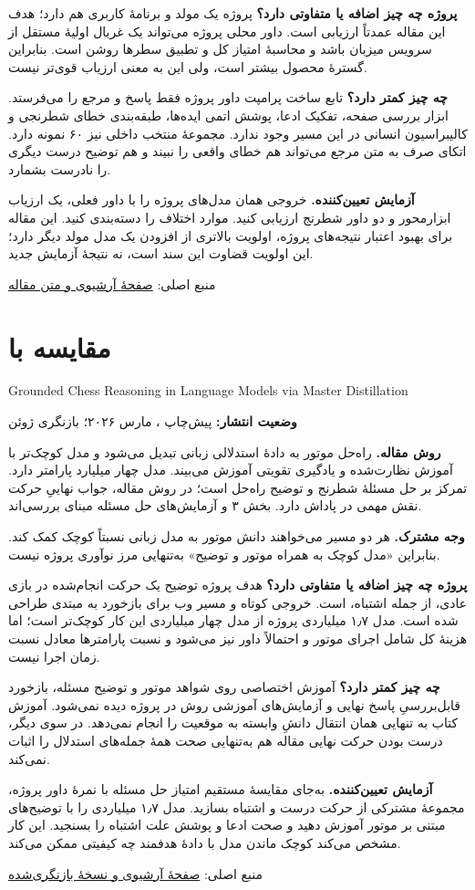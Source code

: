 \documentclass[a4paper,12pt]{article}
\newcommand{\en}[1]{\lr{#1}}
\newcommand{\source}[2]{\par\small منبع اصلی: \href{#1}{#2}\par\normalsize}
\newcommand{\paper}[3]{\clearpage\section{#1}\begin{latin}\small #2\end{latin}\textbf{وضعیت انتشار:} #3\par}
\begin{document}
\textbf{پروژه چه چیز اضافه یا متفاوتی دارد؟} پروژه یک مولد و برنامهٔ کاربری هم دارد؛ هدف این مقاله عمدتاً ارزیابی است. داور محلی پروژه می‌تواند یک غربال اولیهٔ مستقل از سرویس میزبان باشد و محاسبهٔ امتیاز کل و تطبیق سطرها روشن است. بنابراین گسترهٔ محصول بیشتر است، ولی این به معنی ارزیاب قوی‌تر نیست.

\textbf{چه چیز کمتر دارد؟} تابع ساخت پرامپت داور پروژه فقط پاسخ و مرجع را می‌فرستد. ابزار بررسی صفحه، تفکیک ادعا، پوشش اتمی ایده‌ها، طبقه‌بندی خطای شطرنجی و کالیبراسیون انسانی در این مسیر وجود ندارد. مجموعهٔ منتخب داخلی نیز ۶۰ نمونه دارد. اتکای صرف به متن مرجع می‌تواند هم خطای واقعی را نبیند و هم توضیح درست دیگری را نادرست بشمارد.

\textbf{آزمایش تعیین‌کننده.} خروجی همان مدل‌های پروژه را با داور فعلی، یک ارزیاب ابزارمحور و دو داور شطرنج ارزیابی کنید. موارد اختلاف را دسته‌بندی کنید. این مقاله برای بهبود اعتبار نتیجه‌های پروژه، اولویت بالاتری از افزودن یک مدل مولد دیگر دارد؛ این اولویت قضاوت این سند است، نه نتیجهٔ آزمایش جدید.
\source{https://arxiv.org/abs/2608.04240}{صفحهٔ آرشیوی و متن مقاله}

\paper{مقایسه با \en{Tang et al.}}{Grounded Chess Reasoning in Language Models via Master Distillation}{پیش‌چاپ \en{arXiv}، مارس ۲۰۲۶؛ بازنگری ژوئن}
\textbf{روش مقاله.} راه‌حل موتور به دادهٔ استدلالی زبانی تبدیل می‌شود و مدل کوچک‌تر با آموزش نظارت‌شده و یادگیری تقویتی آموزش می‌بیند. مدل \en{C1} چهار میلیارد پارامتر دارد. تمرکز بر حل مسئلهٔ شطرنج و توضیح راه‌حل است؛ در روش مقاله، جواب نهاییِ حرکت نقش مهمی در پاداش دارد. بخش ۳ و آزمایش‌های حل مسئله مبنای بررسی‌اند.

\textbf{وجه مشترک.} هر دو مسیر می‌خواهند دانش موتور به مدل زبانی نسبتاً کوچک کمک کند. بنابراین «مدل کوچک به همراه موتور و توضیح» به‌تنهایی مرز نوآوری پروژه نیست.

\textbf{پروژه چه چیز اضافه یا متفاوتی دارد؟} هدف پروژه توضیح یک حرکت انجام‌شده در بازی عادی، از جمله اشتباه، است. خروجی کوتاه و مسیر وب برای بازخورد به مبتدی طراحی شده است. مدل ۱٫۷ میلیاردی پروژه از مدل چهار میلیاردی این کار کوچک‌تر است؛ اما هزینهٔ کل شامل اجرای موتور و احتمالاً داور نیز می‌شود و نسبت پارامترها معادل نسبت زمان اجرا نیست.

\textbf{چه چیز کمتر دارد؟} آموزش اختصاصی روی شواهد موتور و توضیح مسئله، بازخورد قابل‌بررسیِ پاسخ نهایی و آزمایش‌های آموزشی روش در پروژه دیده نمی‌شود. آموزش کتاب به تنهایی همان انتقال دانشِ وابسته به موقعیت را انجام نمی‌دهد. در سوی دیگر، درست بودن حرکت نهایی مقاله هم به‌تنهایی صحت همهٔ جمله‌های استدلال را اثبات نمی‌کند.

\textbf{آزمایش تعیین‌کننده.} به‌جای مقایسهٔ مستقیم امتیاز حل مسئله با نمرهٔ داور پروژه، مجموعهٔ مشترکی از حرکت درست و اشتباه بسازید. مدل ۱٫۷ میلیاردی را با توضیح‌های مبتنی بر موتور آموزش دهید و صحت ادعا و پوشش علت اشتباه را بسنجید. این کار مشخص می‌کند کوچک ماندن مدل با دادهٔ هدفمند چه کیفیتی ممکن می‌کند.
\source{https://arxiv.org/abs/2603.20510}{صفحهٔ آرشیوی و نسخهٔ بازنگری‌شده}
\end{document}
